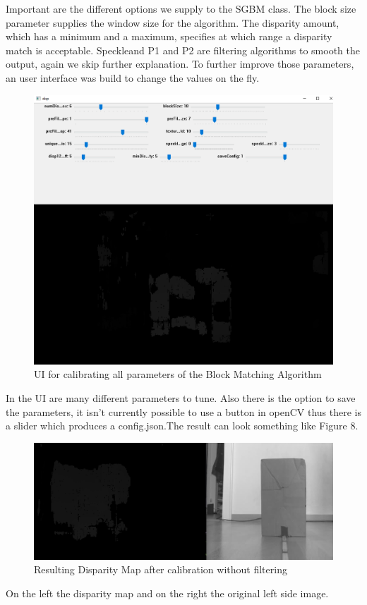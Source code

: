 \documentclass[journal,onecolumn]{IEEEtran}
\begin{document}
Important are the different options we supply to the SGBM class. The block size parameter supplies the window size for the algorithm. The disparity amount, which has a minimum and a maximum, specifies at which range a disparity match is acceptable. Speckleand P1 and P2 are filtering algorithms to smooth the output\cite{stereoSGBM}, again we skip further explanation.
To further improve those parameters, an user interface was build to change the values on the fly.
\begin{figure}[H]
	\centering
	\includegraphics[scale=0.5]{calibrateUI.png}
	\caption{UI for calibrating all parameters of the Block Matching Algorithm}
\end{figure}
\noindent
In the UI are many different parameters to tune. Also there is the option to save the parameters, it isn't currently possible to use a button in openCV thus there is a slider which produces a config.json.The result can look something like Figure 8.
\begin{figure}[H]
	\centering
	\includegraphics[scale=0.5]{disparityMap.png}
	\caption{Resulting Disparity Map after calibration without filtering}
\end{figure}
\noindent
On the left the disparity map and on the right the original left side image.
\end{document}
